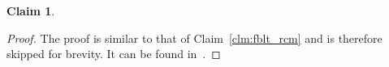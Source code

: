 \documentclass[prodmode,acmtecs]{acmsmall}
\newtheorem{clm}{Claim}
\begin{document}
\begin{compactenum}
\begin{clm}
\end{clm}
\begin{proof}
The proof is similar to that of Claim~\ref{clm:fblt_rcm} and is therefore skipped for  brevity.  It can be found in~\cite{stmconcurrencycontrol_techreport}.

\end{proof}
\end{compactenum}
\end{document}
